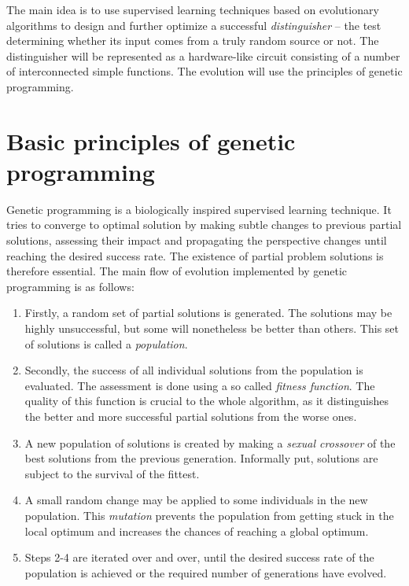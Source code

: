 \documentclass[12pt,oneside]{fithesis2}
\begin{document}
\noindent
The main idea is to use supervised learning techniques based on evolutionary algorithms to design and further 
optimize a successful \textit{distinguisher} -- the test determining whether its input comes from a truly random source or not. 
The distinguisher will be represented as a hardware-like circuit consisting of a number of interconnected simple functions.
The evolution will use the principles of genetic programming.

\section{Basic principles of genetic programming}
\label{sec:basic-ga}

Genetic programming \parencite{genetic-programming} is a biologically inspired supervised learning technique. 
It tries to converge to optimal 
solution by making subtle changes to previous partial solutions, assessing their impact and propagating the perspective changes
until reaching the desired success rate. The existence of partial problem solutions is therefore essential.
The main flow of evolution implemented by genetic programming is as follows:
\begin{enumerate} \rightskip=2em
\item Firstly, a random set of partial solutions is generated. The solutions may be highly unsuccessful,
but some will nonetheless be better than others. This set of solutions is called a \textit{population}.
\item Secondly, the success of all individual solutions from the population is evaluated. The assessment is done using
a so called \textit{fitness function}. The quality of this function is crucial to the whole algorithm, as it
distinguishes the better and more successful partial solutions from the worse ones.
\item A new population of solutions is created by making a \textit{sexual crossover} of the best solutions from the 
previous generation. Informally put, solutions are subject to the survival of the fittest.
\item A small random change may be applied to some individuals in the new population. This \textit{mutation} prevents
the population from getting stuck in the local optimum and increases the chances of reaching a global optimum.
\item Steps 2-4 are iterated over and over, until the desired success rate of the population is achieved or the
required number of generations have evolved.
\end{enumerate}
\end{document}
